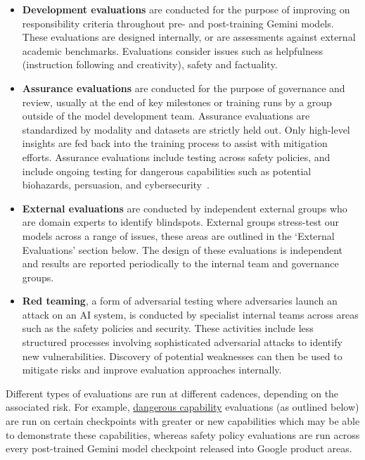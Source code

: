 \begin{itemize}
\item \textbf{Development evaluations} are conducted for the purpose of improving on responsibility criteria throughout pre- and post-training Gemini models. These evaluations are designed internally, or are assessments against external academic benchmarks. Evaluations consider issues such as helpfulness (instruction following and creativity), safety and factuality.
\item \textbf{Assurance evaluations} are conducted for the purpose of governance and review, usually at the end of key milestones or training runs by a group outside of the model development team. Assurance evaluations are standardized by modality and datasets are strictly held out. Only high-level insights are fed back into the training process to assist with mitigation efforts. Assurance evaluations include testing across safety policies, and include ongoing testing for dangerous capabilities such as potential biohazards, persuasion, and cybersecurity~\cite{shevlane2023model}.
\item \textbf{External evaluations} are conducted by independent external groups who are domain experts to identify blindspots. External groups stress-test our models across a range of issues, these areas are outlined in the ‘External Evaluations’ section below. The design of these evaluations is independent and results are reported periodically to the internal team and governance groups. 
\item \textbf{Red teaming}, a form of adversarial testing where adversaries launch an attack on an AI system, is conducted by specialist internal teams across areas such as the safety policies and security. These activities include less structured processes involving sophisticated adversarial attacks to identify new vulnerabilities. Discovery of potential weaknesses can then be used to mitigate risks and improve evaluation approaches internally. 
\end{itemize}

Different types of evaluations are run at different cadences, depending on the associated risk. For example, \href{https://deepmind.google/discover/blog/an-early-warning-system-for-novel-ai-risks/}{dangerous capability} evaluations (as outlined below) are run on certain checkpoints with greater or new capabilities which may be able to demonstrate these capabilities, whereas safety policy evaluations are run across every post-trained Gemini model checkpoint released into Google product areas.


